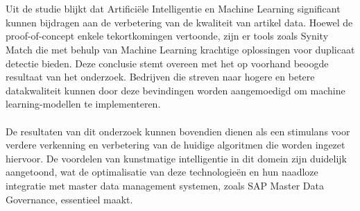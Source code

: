 \\ \\Uit de studie blijkt dat Artificiële Intelligentie en Machine Learning significant kunnen bijdragen aan de verbetering  van de kwaliteit van artikel data. Hoewel de proof-of-concept enkele tekortkomingen vertoonde, zijn er tools zoals Synity Match die met behulp van Machine Learning krachtige oplossingen voor duplicaat detectie bieden. Deze conclusie stemt overeen met het op voorhand beoogde resultaat van het onderzoek. Bedrijven die streven naar hogere en betere datakwaliteit kunnen door deze bevindingen worden aangemoedigd om machine learning-modellen te implementeren.
\\ \\De resultaten van dit onderzoek kunnen bovendien dienen als een stimulans voor verdere verkenning en verbetering van de huidige algoritmen die worden ingezet hiervoor. De voordelen van kunstmatige intelligentie in dit domein zijn duidelijk aangetoond, wat de optimalisatie van deze technologieën en hun naadloze integratie met master data management systemen, zoals SAP Master Data Governance, essentieel maakt.
